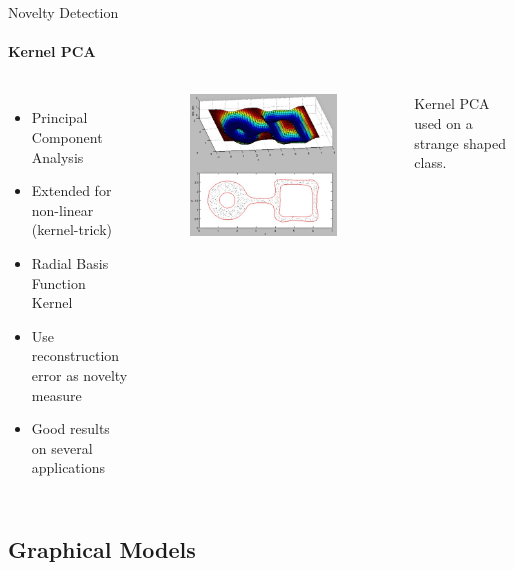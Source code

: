 \documentclass[compress]{beamer}
\begin{document}
\begin{frame}{Novelty Detection}
\framesubtitle{Kernel PCA}
    \begin{columns}[t]
        \begin{itemize}
        \item Principal Component Analysis
        \item Extended for non-linear (kernel-trick)
        \item Radial Basis Function Kernel
        \item Use reconstruction error as novelty measure
        \item Good results on several applications
        \end{itemize}
    \begin{figure}
        \includegraphics[width=0.9\textwidth]{ringlinesquare_kpca}
    \end{figure}
        Kernel PCA used on a strange shaped class\cite{Hoffmann2007863}.
    \end{columns}
\end{frame}

\subsection{Graphical Models}
\end{document}
